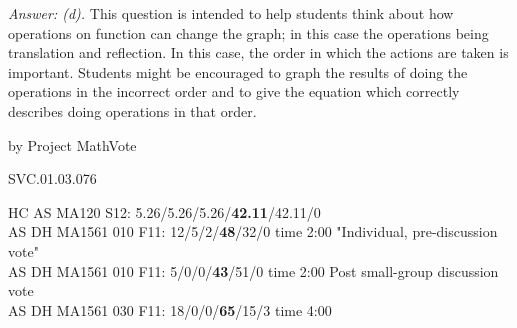 {\it Answer: (d).}  This question is intended to help students think about how operations on function can change the graph; in this case the operations being translation and reflection.  In this case, the order in which the actions are taken is important.  Students might be encouraged to graph the results of doing the operations in the incorrect order and to give the equation which correctly describes doing operations in that order.

\medskip
by Project MathVote

SVC.01.03.076

HC AS MA120 S12: 5.26/5.26/5.26/{\bf42.11}/42.11/0  \\
AS DH MA1561 010 F11: 12/5/2/{\bf48}/32/0 time 2:00 "Individual, pre-discussion vote" \\
AS DH MA1561 010 F11: 5/0/0/{\bf43}/51/0 time 2:00 Post small-group discussion vote \\
AS DH MA1561 030 F11: 18/0/0/{\bf65}/15/3 time 4:00  \\
